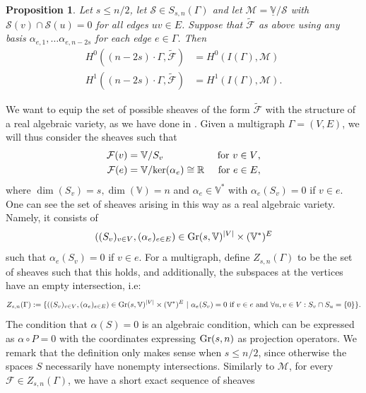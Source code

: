 \documentclass{article}
\newtheorem{proposition}[theorem]{Proposition}
\theoremstyle{definition}
\theoremstyle{remark}
\begin{document}
\begin{proposition}\label{prop: construction-F-tilde}
    Let $s\leq n/2$, let $\mathcal{S} \in S_{s,n}(\Gamma)$ and let $\mathcal{M} = \underline{\mathbb{V}}/\mathcal{S}$ with  $\mathcal{S}(v) \cap \mathcal{S}(u) = 0$ for all edges $uv\in E$. Suppose that $\tilde{\mathcal{F}}$ as above using any basis $\alpha_{e, 1}, \dots \alpha_{e, n-2s}$ for each edge $e\in \Gamma$. Then
        \begin{align*}
        H^{0}((n-2s)\cdot \Gamma, \tilde{\mathcal{F}})&= H^{0}(I(\Gamma), \mathcal{M})\\
        H^{1}((n-2s)\cdot\Gamma, \tilde{\mathcal{F}})&= H^{1}(I(\Gamma),  \mathcal{M}).
    \end{align*}
\end{proposition}


We want to equip the set of possible sheaves of the form $\tilde{\mathcal{F}}$ with the structure of a real algebraic variety, as we have done in . Given a multigraph $\Gamma=(V,E)$, we will thus consider the sheaves such that
\begin{align*}
    \mathcal{F}(v) &= \mathbb{V}/S_v &\textup{ for $v\in V$,}\\
    \mathcal{F}(e) &= \mathbb{V}/\textup{ker}(\alpha_{e}) \cong \mathbb{R} &\textup{ for $e\in E$},
\end{align*}
where $\dim(S_v) = s, \dim(\mathbb{V}) = n$ and $\alpha_e \in \mathbb{V}^{*}$ with $\alpha_{e}(S_v)=0$ if $v\in e$. 
One can see the set of sheaves arising in this way as a real algebraic variety. Namely, it consists of 
\begin{equation*}
 \left( (S_{v})_{v\in V}, (\alpha_{e})_{e\in E}\right) \in \textup{Gr}(s, \mathbb{V})^{|V|} \times (\mathbb{V}^{*})^{E}
\end{equation*}
such that $\alpha_{e}(S_v) = 0$ if $v\in e$. For a multigraph, define $Z_{s, n}(\Gamma)$ to be the set of sheaves such that this holds, and additionally, the subspaces at the vertices have an empty intersection, i.e:
\begin{equation*}
    Z_{s, n}(\Gamma):= \{ \left((S_{v})_{v\in V}, (\alpha_{e})_{e\in E}\right)  \in \textup{Gr}(s, \mathbb{V})^{|V|} \times (\mathbb{V}^{*})^{E}~\vert ~ \alpha_{e}(S_{v} ) = 0 \textup{ if $v\in e$ and } \forall u, v \in V: S_{v} \cap S_{u} = \{0\}    \}.
\end{equation*}
The condition that $\alpha(S) = 0$ is an algebraic condition, which can be expressed as $\alpha \circ P = 0$ with the coordinates expressing $\textup{Gr}(s, n)$ as projection operators. We remark that the definition only makes sense when $s  \leq n/2$, since otherwise the spaces $S$ necessarily have nonempty intersections. Similarly to $\mathcal{M}$, for every $\mathcal{F} \in Z_{s,n}(\Gamma)$, we have a short exact sequence of sheaves
\end{document}
